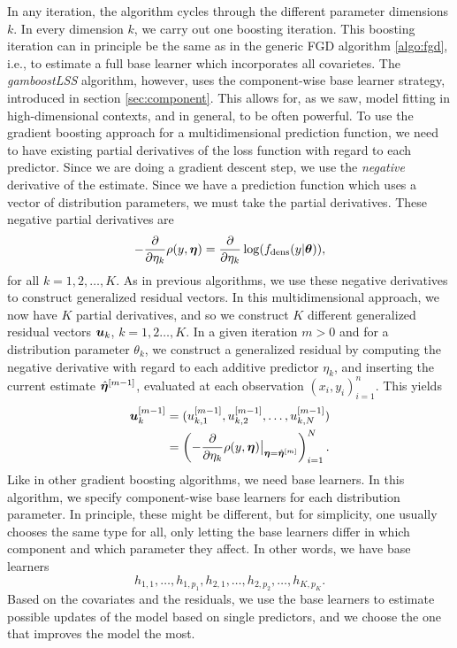 In any iteration, the algorithm cycles through the different parameter dimensions $k$.
In every dimension $k$, we carry out one boosting iteration.
This boosting iteration can in principle be the same as in the generic FGD algorithm \eqref{algo:fgd}, i.e., to estimate a full base learner which incorporates all covarietes.
The \textit{gamboostLSS} algorithm, however, uses the component-wise base learner strategy, introduced in section \ref{sec:component}.
This allows for, as we saw, model fitting in high-dimensional contexts, and in general, to be often powerful.
To use the gradient boosting approach for a multidimensional prediction function, we need to have existing partial derivatives of the loss function with regard to each predictor.
Since we are doing a gradient descent step, we use the \textit{negative} derivative of the estimate.
Since we have a prediction function which uses a vector of distribution parameters, we must take the partial derivatives.
These negative partial derivatives are
\begin{equation}
    -\frac{\partial}{\partial\eta_k}\rho(y,\boldsymbol{\eta})=\frac{\partial}{\partial\eta_k}\log(f_{\text{dens}}(y|\boldsymbol{\theta})),
\end{equation}
for all $k=1,2,\ldots,K$. As in previous algorithms, we use these negative derivatives to construct generalized residual vectors.
In this multidimensional approach, we now have $K$ partial derivatives, and so we construct $K$ different generalized residual vectors $\bm{u}_k$, $k=1,2\ldots,K$.
In a given iteration $m>0$ and for a distribution parameter $\theta_k$, we construct a generalized residual by computing the negative derivative with regard to each additive predictor $\eta_k$, and inserting the current estimate $\hat{\boldsymbol{\eta}}^{[m-1]}$, evaluated at each observation $(x_i,y_i)_{i=1}^n$.
This yields
\begin{align*}
    \bm{u}_k^{[m-1]}&=(u_{k,1}^{[m-1]},u_{k,2}^{[m-1]},\ldots,u_{k,N}^{[m-1]})\\
    &=\left(-\frac{\partial}{\partial \eta_k}\rho(y,\boldsymbol{\eta})\big\rvert_{\boldsymbol{\eta}=\hat{\boldsymbol{\eta}}^{[m]}}\right)_{i=1}^N.
\end{align*}
Like in other gradient boosting algorithms, we need base learners.
In this algorithm, we specify component-wise base learners for each distribution parameter.
In principle, these might be different, but for simplicity, one usually chooses the same type for all, only letting the base learners differ in which component and which parameter they affect.
In other words, we have base learners
\begin{equation}
    h_{1,1},\ldots,h_{1,p_1},h_{2,1},\ldots,h_{2,p_2},\ldots,h_{K,p_K}.
\end{equation}
Based on the covariates and the residuals, we use the base learners to estimate possible updates of the model based on single predictors, and we choose the one that improves the model the most.

